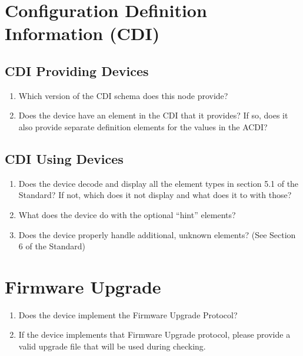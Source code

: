 \section{Configuration Definition Information (CDI)}
    \subsection{CDI Providing Devices}
        \begin{enumerate}
            \item Which version of the CDI schema does this node provide?
            \item Does the device have an  element in the CDI that it provides?
                If so, does it also provide separate definition elements for the
                values in the ACDI?
        \end{enumerate}
    \subsection{CDI Using Devices}
        \begin{enumerate}
            \item Does the device decode and display all the element types in section 
                    5.1 of the Standard? If not, which does it not display
                    and what does it to with those?
            \item What does the device do with the optional ``hint'' elements?
            \item Does the device properly handle additional, unknown elements? 
                    (See Section 6 of the Standard)
        \end{enumerate}

\section{Firmware Upgrade}
    \begin{enumerate}
        \item Does the device implement the Firmware Upgrade Protocol?
        \item If the device implements that Firmware Upgrade protocol,
                please provide a valid upgrade file that will be used
                during checking.
    \end{enumerate}


